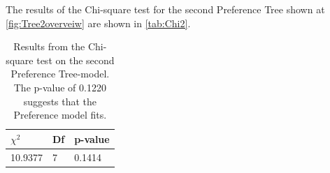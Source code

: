 \noindent
%
The results of the Chi-square test for the second Preference Tree shown at \autoref{fig:Tree2overveiw} are shown in \autoref{tab:Chi2}. 
%
\begin{table}[H]
\centering
\begin{tabular}{@{}lll@{}}
\toprule
$\chi^{2}$   & Df  & p-value \\ \midrule
10.9377      & 7   & 0.1414  \\ \bottomrule
\end{tabular}
\caption{Results from the Chi-square test on the second Preference Tree-model. The p-value of 0.1220 suggests that the Preference model fits.}
\label{tab:Chi2}
\end{table} 